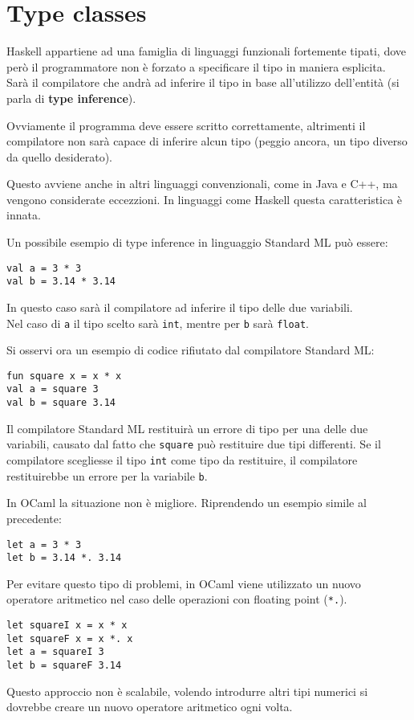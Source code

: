 \documentclass{article}
\begin{document}
\pagestyle{empty}

\section*{Type classes}
\large

Haskell appartiene ad una famiglia di linguaggi funzionali fortemente tipati, dove però il programmatore non è forzato a specificare il tipo in maniera esplicita. Sarà il compilatore che andrà ad inferire il tipo in base all'utilizzo dell'entità (si parla di \textbf{type inference}).

Ovviamente il programma deve essere scritto correttamente, altrimenti il compilatore non sarà capace di inferire alcun tipo (peggio ancora, un tipo diverso da quello desiderato).

Questo avviene anche in altri linguaggi convenzionali, come in Java e C++, ma vengono considerate eccezzioni. In linguaggi come Haskell questa caratteristica è innata.

Un possibile esempio di type inference in linguaggio Standard ML può essere:
\begin{tcolorbox}
\begin{verbatim}
val a = 3 * 3
val b = 3.14 * 3.14
\end{verbatim}
\end{tcolorbox}
In questo caso sarà il compilatore ad inferire il tipo delle due variabili.\\
Nel caso di \texttt{a} il tipo scelto sarà \texttt{int}, mentre per \texttt{b} sarà \texttt{float}.

Si osservi ora un esempio di codice rifiutato dal compilatore Standard ML:
\begin{tcolorbox}
\begin{verbatim}
fun square x = x * x
val a = square 3
val b = square 3.14
\end{verbatim}
\end{tcolorbox}
Il compilatore Standard ML restituirà un errore di tipo per una delle due variabili, causato dal fatto che \texttt{square} può restituire due tipi differenti. Se il compilatore scegliesse il tipo \texttt{int} come tipo da restituire, il compilatore restituirebbe un errore per la variabile \texttt{b}.

In OCaml la situazione non è migliore. Riprendendo un esempio simile al precedente:
\begin{tcolorbox}
\begin{verbatim}
let a = 3 * 3
let b = 3.14 *. 3.14
\end{verbatim}
\end{tcolorbox}
Per evitare questo tipo di problemi, in OCaml viene utilizzato un nuovo operatore aritmetico nel caso delle operazioni con floating point (\texttt{*.}).
\begin{tcolorbox}
\begin{verbatim}
let squareI x = x * x
let squareF x = x *. x
let a = squareI 3
let b = squareF 3.14
\end{verbatim}
\end{tcolorbox}
Questo approccio non è scalabile, volendo introdurre altri tipi numerici si dovrebbe creare un nuovo operatore aritmetico ogni volta.
\end{document}
